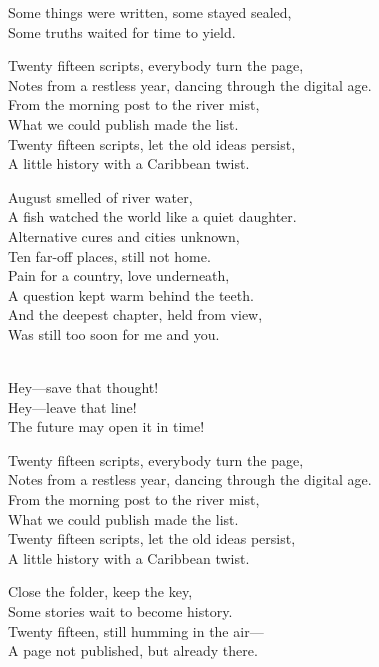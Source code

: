 \begin{lyrics}
Some things were written, some stayed sealed,\\
Some truths waited for time to yield.

Twenty fifteen scripts, everybody turn the page,\\
Notes from a restless year, dancing through the digital age.\\
From the morning post to the river mist,\\
What we could publish made the list.\\
Twenty fifteen scripts, let the old ideas persist,\\
A little history with a Caribbean twist.

August smelled of river water,\\
A fish watched the world like a quiet daughter.\\
Alternative cures and cities unknown,\\
Ten far-off places, still not home.\\
Pain for a country, love underneath,\\
A question kept warm behind the teeth.\\
And the deepest chapter, held from view,\\
Was still too soon for me and you.

\\
Hey—save that thought!\\
Hey—leave that line!\\
The future may open it in time!

Twenty fifteen scripts, everybody turn the page,\\
Notes from a restless year, dancing through the digital age.\\
From the morning post to the river mist,\\
What we could publish made the list.\\
Twenty fifteen scripts, let the old ideas persist,\\
A little history with a Caribbean twist.

Close the folder, keep the key,\\
Some stories wait to become history.\\
Twenty fifteen, still humming in the air—\\
A page not published, but already there.
\end{lyrics}

